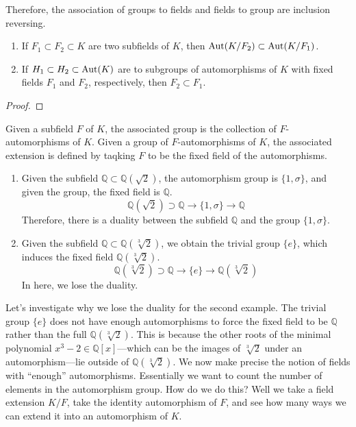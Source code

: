   \begin{theorem}
    Therefore, the association of groups to fields and fields to group are inclusion reversing. 
    \begin{enumerate}
      \item If $F_1 \subset F_2 \subset K$ are two subfields of $K$, then $\Aut(K/F_2) \subset \Aut(K/F_1)$. 
      \item If $H_1 \subset H_2 \subset \Aut(K)$ are to subgroups of automorphisms of $K$ with fixed fields $F_1$ and $F_2$, respectively, then $F_2 \subset F_1$. 
    \end{enumerate}
  \end{theorem}
  \begin{proof}
    
  \end{proof}

  Given a subfield $F$ of $K$, the associated group is the collection of $F$-automorphisms of $K$. Given a group of $F$-automorphisms of $K$, the associated extension is defined by taqking $F$ to be the fixed field of the automorphisms. 
  \begin{enumerate}
    \item Given the subfield $\mathbb{Q} \subset \mathbb{Q}(\sqrt{2})$, the automorphism group is $\{1, \sigma\}$, and given the group, the fixed field is $\mathbb{Q}$. 
      \begin{equation}
        \mathbb{Q}(\sqrt{2}) \supset \mathbb{Q} \longrightarrow \{1, \sigma\} \longrightarrow \mathbb{Q}
      \end{equation}
      Therefore, there is a duality between the subfield $\mathbb{Q}$ and the group $\{1, \sigma\}$. 

    \item Given the subfield $\mathbb{Q} \subset \mathbb{Q}(\sqrt[3]{2})$, we obtain the trivial group $\{e\}$, which induces the fixed field $\mathbb{Q}(\sqrt[3]{2})$. 
      \begin{equation}
        \mathbb{Q}(\sqrt[3]{2}) \supset \mathbb{Q} \longrightarrow \{e\} \longrightarrow \mathbb{Q}(\sqrt[3]{2})
      \end{equation}
      In here, we lose the duality. 
  \end{enumerate}

  Let's investigate why we lose the duality for the second example. The trivial group $\{e\}$ does not have enough automorphisms to force the fixed field to be $\mathbb{Q}$ rather than the full $\mathbb{Q}(\sqrt[3]{2})$. This is because the other roots of the minimal polynomial $x^3 - 2 \in \mathbb{Q}[x]$---which can be the images of $\sqrt[3]{2}$ under an automorphism---lie outside of $\mathbb{Q}(\sqrt[3]{2})$. We now make precise the notion of fields with ``enough'' automorphisms. Essentially we want to count the number of elements in the automorphism group. How do we do this? Well we take a field extension $K/F$, take the identity automorphism of $F$, and see how many ways we can extend it into an automorphism of $K$. 


